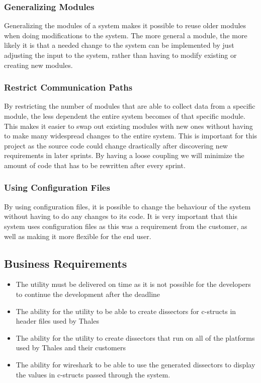 \subsubsection{Generalizing Modules}
Generalizing the modules of a system makes it possible to reuse older modules when doing modifications to the system. The more general a module, the more likely it is that a needed change to the system can be implemented by just adjusting the input to the system, rather than having to modify existing or creating new modules.

\subsubsection{Restrict Communication Paths}
By restricting the number of modules that are able to collect data from a specific module, the less dependent the entire system becomes of that specific module. This makes it easier to swap out existing modules with new ones without having to make many widespread changes to the entire system. This is important for this project as the source code could change drastically after discovering new requirements in later sprints. By having a loose coupling we will minimize the amount of code that has to be rewritten after every sprint.

\subsubsection{Using Configuration Files}
By using configuration files, it is possible to change the behaviour of the system without having to do any changes to its code. It is very important that this system uses configuration files as this was a requirement from the customer, as well as making it more flexible for the end user.

\subsection{Business Requirements}
\begin{itemize}
\item The \gls{utility} must be delivered on time as it is not possible for the developers to continue the development after the deadline
\item The ability for the \gls{utility} to be able to create \glspl{dissector} for \Gls{c}-\glspl{struct} in \gls{header} files used by Thales
\item The ability for the \gls{utility} to create \glspl{dissector} that run on all of the platforms used by Thales and their customers
\item The ability for \Gls{wireshark} to be able to use the generated \glspl{dissector} to display the values in \Gls{c}-\glspl{struct} passed through the system.
\end{itemize}

